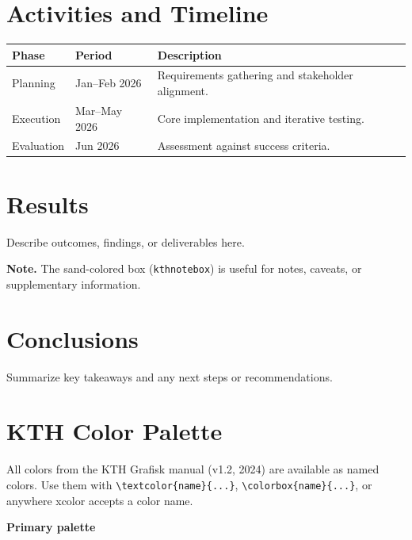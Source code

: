 \section{Activities and Timeline}

\begin{center}
\begin{tabular}{llp{8cm}}
  \hline
  \textbf{Phase} & \textbf{Period} & \textbf{Description} \\
  \hline
  Planning   & Jan–Feb 2026 & Requirements gathering and stakeholder alignment. \\
  Execution  & Mar–May 2026 & Core implementation and iterative testing. \\
  Evaluation & Jun 2026     & Assessment against success criteria. \\
  \hline
\end{tabular}
\end{center}


\section{Results}

Describe outcomes, findings, or deliverables here.

\begin{kthnotebox}
  \textbf{Note.}
  The sand-colored box (\texttt{kthnotebox}) is useful for notes,
  caveats, or supplementary information.
\end{kthnotebox}


\section{Conclusions}

Summarize key takeaways and any next steps or recommendations.


\section{KTH Color Palette}

All colors from the KTH Grafisk manual (v1.2, 2024) are available as named
colors. Use them with \verb|\textcolor{name}{...}|, \verb|\colorbox{name}{...}|,
or anywhere \textsf{xcolor} accepts a color name.

\medskip
\textbf{Primary palette}

